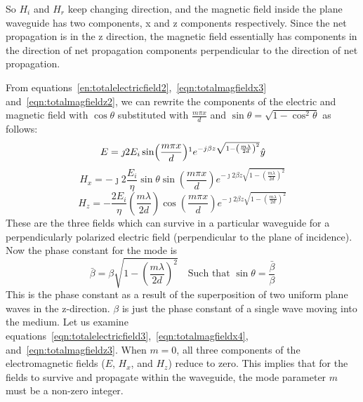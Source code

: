 So $H_i$ and $H_r$ keep changing direction, and the magnetic field inside the plane waveguide has two components, x and z components respectively. Since the net propagation is in the z direction, the magnetic field essentially has components in the direction of net propagation components perpendicular to the direction of net propagation.

From equations~\eqref{en:totalelectricfield2},~\eqref{eqn:totalmagfieldx3} and~\eqref{eqn:totalmagfieldz2}, we can rewrite the components of the electric and magnetic field with $\cos\theta$ substituted with $\frac{m\pi x}{d}$ and $\sin\theta = \sqrt{1 - \cos^2\theta}$ as follows:
\begin{dmath}
E=\jmath 2 E_i \sin(\frac{m\pi x}{d})\footnotemark e^{-j\beta z\sqrt{1 - \left(\frac{m\lambda}{2d}\right)^2}} \hat{y}
\label{eqn:totalelectricfield3}
\end{dmath}
\begin{dmath}
H_x = -\jmath 2\frac{E_i}{\eta}\sin\theta\sin(\frac{m\pi x}{d}) e^{-\jmath 2\beta z\sqrt{1 - \left(\frac{m\lambda}{2d}\right)^2}}
\label{eqn:totalmagfieldx4}
\end{dmath}
\begin{dmath}
H_z = -\frac{2E_i}{\eta}\left(\frac{m\lambda}{2d}\right)\cos(\frac{m\pi x}{d})e^{-\jmath 2\beta z\sqrt{1 - \left(\frac{m\lambda}{2d}\right)^2}}
\label{eqn:totalmagfieldz3}
\end{dmath}
These are the three fields which can survive in a particular waveguide for a perpendicularly polarized electric field (perpendicular to the plane of incidence). Now the phase constant for the mode is
\begin{dmath}
\bar{\beta} = \beta\sqrt{1 - \left(\frac{m\lambda}{2d}\right)^2}\quad\text{Such that $\sin\theta
=\frac{\bar{\beta}}{\beta}$}
\label{eqn:phaseconst}
\end{dmath}
This is the phase constant as a result of the superposition of two uniform plane waves in the z-direction. $\beta$ is just the phase constant of a single wave moving into the medium. Let us examine equations~\eqref{eqn:totalelectricfield3},~\eqref{eqn:totalmagfieldx4}, and~\eqref{eqn:totalmagfieldz3}. When $m=0$, all three components of the electromagnetic fields ($E$, $H_x$, and $H_z$) reduce to zero. This implies that for the fields to survive and propagate within the waveguide, the mode parameter $m$ must be a non-zero integer.

